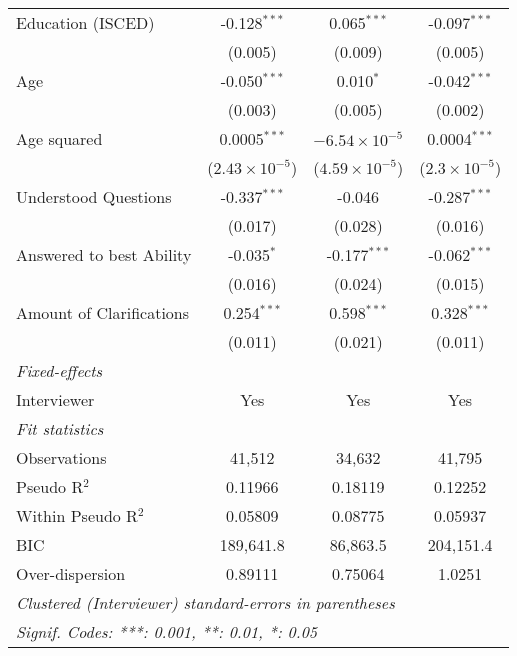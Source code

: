 \begin{table}[htbp]
\begin{tabular}{lccc}
      Education (ISCED)              & -0.128$^{***}$          & 0.065$^{***}$           & -0.097$^{***}$\\   
                                     & (0.005)                 & (0.009)                 & (0.005)\\   
      Age                            & -0.050$^{***}$          & 0.010$^{*}$             & -0.042$^{***}$\\   
                                     & (0.003)                 & (0.005)                 & (0.002)\\   
      Age squared                    & 0.0005$^{***}$          & $-6.54\times 10^{-5}$   & 0.0004$^{***}$\\   
                                     & ($2.43\times 10^{-5}$)  & ($4.59\times 10^{-5}$)  & ($2.3\times 10^{-5}$)\\    
      Understood Questions           & -0.337$^{***}$          & -0.046                  & -0.287$^{***}$\\   
                                     & (0.017)                 & (0.028)                 & (0.016)\\   
      Answered to best Ability       & -0.035$^{*}$            & -0.177$^{***}$          & -0.062$^{***}$\\   
                                     & (0.016)                 & (0.024)                 & (0.015)\\   
      Amount of Clarifications       & 0.254$^{***}$           & 0.598$^{***}$           & 0.328$^{***}$\\   
                                     & (0.011)                 & (0.021)                 & (0.011)\\   
      \midrule
      \emph{Fixed-effects}\\
      Interviewer                    & Yes                     & Yes                     & Yes\\  
      \midrule
      \emph{Fit statistics}\\
      Observations                   & 41,512                  & 34,632                  & 41,795\\  
      Pseudo R$^2$                   & 0.11966                 & 0.18119                 & 0.12252\\  
      Within Pseudo R$^2$            & 0.05809                 & 0.08775                 & 0.05937\\  
      BIC                            & 189,641.8               & 86,863.5                & 204,151.4\\  
      Over-dispersion                & 0.89111                 & 0.75064                 & 1.0251\\  
      \midrule \midrule
      \multicolumn{4}{l}{\emph{Clustered (Interviewer) standard-errors in parentheses}}\\
      \multicolumn{4}{l}{\emph{Signif. Codes: ***: 0.001, **: 0.01, *: 0.05}}\\
   \end{tabular}
\end{table}


